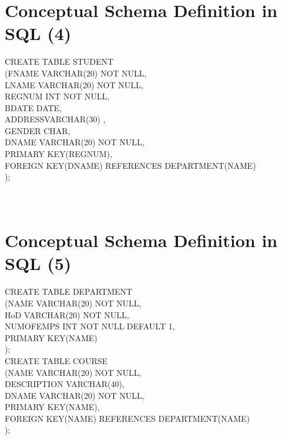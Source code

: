 \documentclass[12pt]{article}
\begin{document}
\begin{itemize}
\begin{itemize}
\begin{itemize}
\section{Conceptual Schema Definition in SQL (4)}
CREATE TABLE STUDENT\\ 
(FNAME VARCHAR(20) NOT NULL,\\ 
LNAME VARCHAR(20) NOT NULL,\\ 
REGNUM   INT NOT NULL,\\ 
BDATE DATE,\\ 
ADDRESSVARCHAR(30) ,\\ 
GENDER CHAR,\\ 
DNAME VARCHAR(20) NOT NULL,\\ 
PRIMARY KEY(REGNUM),\\ 
FOREIGN KEY(DNAME) REFERENCES DEPARTMENT(NAME)\\ 
);\\ 
\\ 
 \\ 
\section{Conceptual Schema Definition in SQL (5)}
CREATE TABLE DEPARTMENT\\ 
(NAME VARCHAR(20) NOT NULL,\\ 
HoD VARCHAR(20) NOT NULL,\\ 
NUMOFEMPS INT NOT NULL DEFAULT 1,\\ 
PRIMARY KEY(NAME)\\ 
);\\ 
CREATE TABLE COURSE\\ 
(NAME VARCHAR(20) NOT NULL,\\ 
DESCRIPTION VARCHAR(40),\\ 
DNAME VARCHAR(20) NOT NULL,\\ 
PRIMARY KEY(NAME),\\ 
FOREIGN KEY(NAME) REFERENCES DEPARTMENT(NAME)\\ 
);\\ 
\\ 
 \\ 

\end{itemize}
\end{itemize}
\end{itemize}
\end{document}
